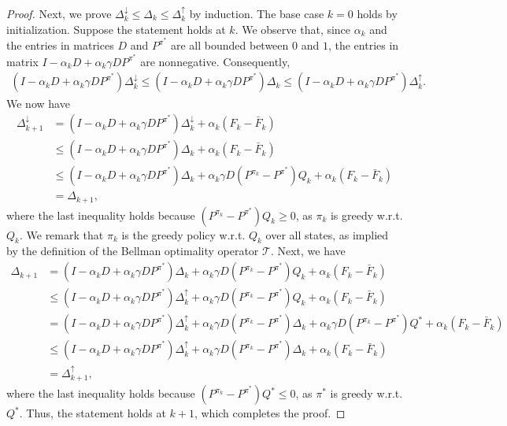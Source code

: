 \documentclass{opt2025} %
\begin{document}
\begin{proof}
Next, we prove $\Delta^{\downarrow}_k \leq \Delta_k \leq \Delta^{\uparrow}_k$ by induction. The base case $k=0$ holds by initialization. Suppose the statement holds at $k$. We observe that, since $\alpha_k$ and the entries in matrices $D$ and $P^{\pi^*}$ are all bounded between $0$ and $1$, the entries in matrix $I - \alpha_kD + \alpha_k \gamma D P^{\pi^*}$ are nonnegative. Consequently,
\begin{align*}
(I - \alpha_kD + \alpha_k \gamma D P^{\pi^*}) \Delta^{\downarrow}_{k} \leq (I - \alpha_kD + \alpha_k \gamma D P^{\pi^*}) \Delta_{k} \leq (I - \alpha_kD + \alpha_k \gamma D P^{\pi^*}) \Delta^{\uparrow}_{k}.
\end{align*}
We now have
\begin{align*}
\Delta^{\downarrow}_{k+1} &= (I - \alpha_kD + \alpha_k \gamma D P^{\pi^*})\Delta^{\downarrow}_k  + \alpha_k(F_k - \bar{F}_k)\\
&\leq (I - \alpha_kD + \alpha_k \gamma D P^{\pi^*})\Delta_k  + \alpha_k(F_k - \bar{F}_k)\\
&\leq (I - \alpha_kD + \alpha_k \gamma D P^{\pi^*})\Delta_k + \alpha_k \gamma D(P^{\pi_k}-P^{\pi^*} )Q_k  + \alpha_k(F_k - \bar{F}_k)\\
&=\Delta_{k+1},
\end{align*}
where the last inequality holds because $(P^{\pi_k}-P^{\pi^*} )Q_k \geq 0$, as $\pi_k$ is greedy w.r.t. $Q_k$. We remark that $\pi_k$ is the greedy policy w.r.t. $Q_k$ over all states, as implied by the definition of the Bellman optimality operator $\mathcal{T}$. Next, we have
\begin{align*}
\Delta_{k+1} &= (I - \alpha_kD + \alpha_k \gamma D P^{\pi^*})\Delta_k + \alpha_k \gamma D(P^{\pi_k}-P^{\pi^*} )Q_k  + \alpha_k(F_k - \bar{F}_k)\\
&\leq (I - \alpha_kD + \alpha_k \gamma D P^{\pi^*})\Delta^{\uparrow}_k + \alpha_k \gamma D(P^{\pi_k}-P^{\pi^*} )Q_k  + \alpha_k(F_k - \bar{F}_k)\\
&= (I - \alpha_kD + \alpha_k \gamma D P^{\pi^*})\Delta^{\uparrow}_k + \alpha_k \gamma D(P^{\pi_k}-P^{\pi^*} )\Delta_k  + \alpha_k \gamma D(P^{\pi_k}-P^{\pi^*} )Q^* + \alpha_k(F_k - \bar{F}_k)\\
&\leq (I - \alpha_kD + \alpha_k \gamma D P^{\pi^*})\Delta^{\uparrow}_k + \alpha_k \gamma D(P^{\pi_k}-P^{\pi^*} )\Delta_k +\alpha_k(F_k - \bar{F}_k)\\
&= \Delta^{\uparrow}_{k+1},
\end{align*}
where the last inequality holds because $(P^{\pi_k}-P^{\pi^*} )Q^* \leq 0$, as $\pi^*$ is greedy w.r.t. $Q^*$. Thus, the statement holds at $k+1$, which completes the proof.
\end{proof}
\end{document}
